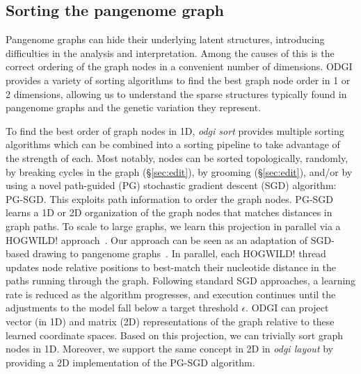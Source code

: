 \documentclass{bioinfo}
\begin{document}
\subsection{Sorting the pangenome graph}
\label{sec:sort}

Pangenome graphs can hide their underlying latent structures, introducing difficulties in the analysis and interpretation. %
Among the causes of this is the correct ordering of the graph nodes in a convenient number of dimensions.
ODGI provides a variety of sorting algorithms to find the best graph node order in 1 or 2 dimensions, allowing us
to understand the sparse structures typically found in pangenome graphs and the genetic variation they represent.

To find the best order of graph nodes in 1D, \textit{odgi sort} provides multiple sorting algorithms which can be combined into a sorting pipeline to take advantage of the strength of each.
Most notably, nodes can be sorted topologically, randomly, by breaking cycles in the graph (\S\ref{sec:edit}), by grooming (\S\ref{sec:edit}), and/or by using a novel path-guided (PG) stochastic gradient descent (SGD) algorithm: PG-SGD.
This exploits path information to order the graph nodes.
PG-SGD learns a 1D or 2D organization of the graph nodes that matches distances in graph paths.
To scale to large graphs, we learn this projection in parallel via a HOGWILD! approach~\citep{niu2011hogwild}.
Our approach can be seen as an adaptation of SGD-based drawing to pangenome graphs~\citep{zheng2018graph}.
In parallel, each HOGWILD! thread updates node relative positions to best-match their nucleotide distance in the paths running through the graph.
Following standard SGD approaches, a learning rate is reduced as the algorithm progresses, and execution continues until the adjustments to the model fall below a target threshold $\epsilon$.
ODGI can project vector (in 1D) and matrix (2D) representations of the graph relative to these learned coordinate spaces.
Based on this projection, we can trivially sort graph nodes in 1D.
Moreover, we support the same concept in 2D in \textit{odgi layout} by providing a 2D implementation of the PG-SGD algorithm.



\end{document}
